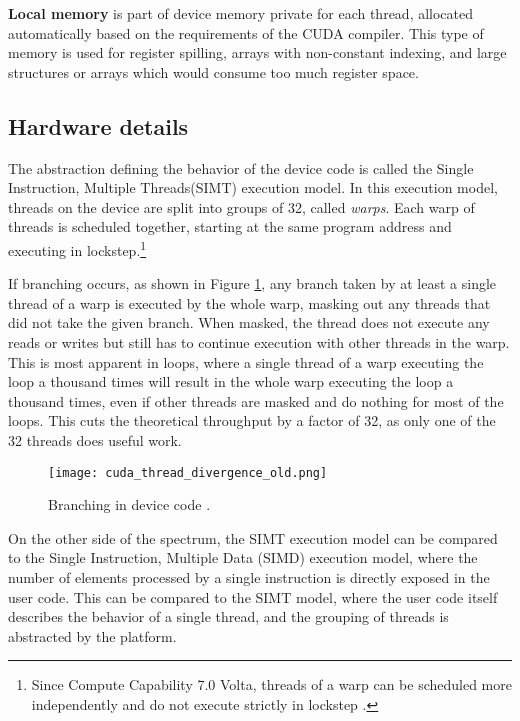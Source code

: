 \textbf{Local memory} is part of device memory private for each thread, allocated automatically based on the requirements of the CUDA compiler. This type of memory is used for register spilling, arrays with non-constant indexing, and large structures or arrays which would consume too much register space. 


\subsection{Hardware details}
\label{sec:hardware_details}
The abstraction defining the behavior of the device code is called the Single Instruction, Multiple Threads(SIMT) execution model. In this execution model, threads on the device are split into groups of 32, called \textit{warps}. Each warp of threads is scheduled together, starting at the same program address and executing in lockstep.\footnote{Since Compute Capability 7.0 Volta, threads of a warp can be scheduled more independently and do not execute strictly in lockstep \citep{paper:volta}.}


If branching occurs, as shown in Figure \ref{fig:thread_divergence_old}, any branch taken by at least a single thread of a warp is executed by the whole warp, masking out any threads that did not take the given branch. When masked, the thread does not execute any reads or writes but still has to continue execution with other threads in the warp. This is most apparent in loops, where a single thread of a warp executing the loop a thousand times will result in the whole warp executing the loop a thousand times, even if other threads are masked and do nothing for most of the loops. This cuts the theoretical throughput by a factor of 32, as only one of the 32 threads does useful work.

\begin{figure}[ht]
	\centering
	\texttt{[image: cuda\_thread\_divergence\_old.png]}
	\caption{Branching in device code \citep{site:cuda}.}
	\label{fig:thread_divergence_old}
\end{figure}

On the other side of the spectrum, the SIMT execution model can be compared to the Single Instruction, Multiple Data (SIMD) execution model, where the number of elements processed by a single instruction is directly exposed in the user code. This can be compared to the SIMT model, where the user code itself describes the behavior of a single thread, and the grouping of threads is abstracted by the platform. 

